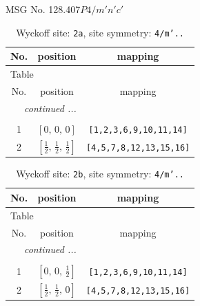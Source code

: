 \documentclass[fleqn,8pt]{jsarticle}
\begin{document}
\setcounter{MaxMatrixCols}{32}

\renewcommand{\tablename}{Table~}
\renewcommand{\figurename}{Figure~}
\begin{center}
\LARGE
MSG No. 128.407\quad$P4/m'n'c'$
\end{center}
\renewcommand{\arraystretch}{1.2}
\begin{longtable}{ccc}
\caption{Wyckoff site: {\tt 2a}, site symmetry: {\tt 4/m'..}}
 \\
 \hline \hline
No. & position & mapping \\ \hline \endfirsthead

\multicolumn{2}{l}{\tablename\ \thetable{}} \\
 \hline \hline
No. & position & mapping \\ \hline \endhead

 \hline \hline
\multicolumn{2}{r}{\footnotesize\it continued ...} \\ \endfoot

 \hline \hline
\multicolumn{2}{r}{} \\ \endlastfoot

1 & $\left[ 0,\, 0,\, 0 \right]$ & {\tt [1,2,3,6,9,10,11,14]} \\ \hline
2 & $\left[ \frac{1}{2},\, \frac{1}{2},\, \frac{1}{2} \right]$ & {\tt [4,5,7,8,12,13,15,16]} \\
\end{longtable}
\renewcommand{\arraystretch}{1.2}
\begin{longtable}{ccc}
\caption{Wyckoff site: {\tt 2b}, site symmetry: {\tt 4/m'..}}
 \\
 \hline \hline
No. & position & mapping \\ \hline \endfirsthead

\multicolumn{2}{l}{\tablename\ \thetable{}} \\
 \hline \hline
No. & position & mapping \\ \hline \endhead

 \hline \hline
\multicolumn{2}{r}{\footnotesize\it continued ...} \\ \endfoot

 \hline \hline
\multicolumn{2}{r}{} \\ \endlastfoot

1 & $\left[ 0,\, 0,\, \frac{1}{2} \right]$ & {\tt [1,2,3,6,9,10,11,14]} \\ \hline
2 & $\left[ \frac{1}{2},\, \frac{1}{2},\, 0 \right]$ & {\tt [4,5,7,8,12,13,15,16]} \\
\end{longtable}
\end{document}
